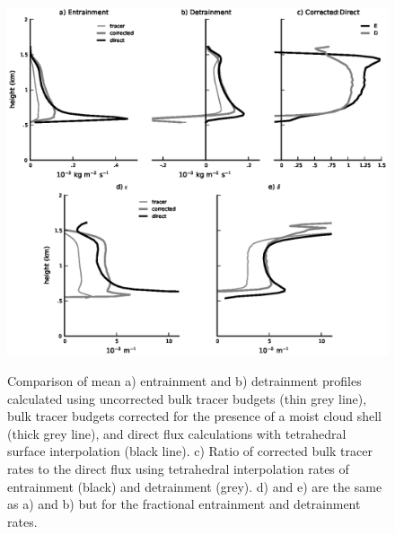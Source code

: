 \documentclass[12pt]{article}
\begin{document}
\begin{figure}[t]
  \noindent\includegraphics[width=40pc,angle=0]{./figures/corrected_entrainment_core}\\
  \caption{Comparison of mean a) entrainment and b) detrainment profiles 
calculated using uncorrected bulk tracer budgets (thin grey line), bulk tracer 
budgets corrected for the presence of a moist cloud shell (thick grey line), and
direct flux calculations with tetrahedral surface interpolation (black line).
c) Ratio of corrected bulk tracer rates to the direct flux using
tetrahedral interpolation rates of entrainment (black) and detrainment (grey).
d) and e) are the same as a) and b) but for the fractional entrainment and
detrainment rates.}\label{fig:corrected_entrainment}
\end{figure}
\end{document}
